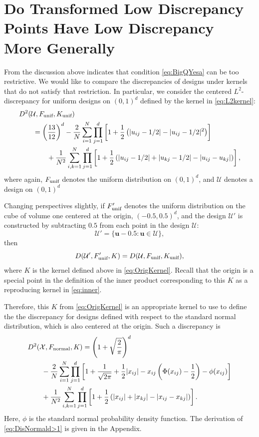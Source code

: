 \documentclass[graybox]{svmult}
\newcommand{\vu}{\boldsymbol{u}}
\newcommand{\Udes}{\mathcal{U}}
\newcommand{\Xdes}{\mathcal{X}}
\newcommand{\unif}{\textup{unif}}
\newcommand{\normal}{\textup{normal}}
\begin{document}
\section{Do Transformed Low Discrepancy Points Have Low Discrepancy More Generally}

From the discussion above indicates that condition \eqref{eq:BigQYesa} can be too restrictive.  We would like to compare the discrepancies of designs under kernels that do not satisfy that restriction.  In particular, we consider the centered $L^2$-discrepancy for uniform designs on $(0,1)^d$ defined by the kernel in \eqref{eq:L2kernel}:
\begin{align*}
\MoveEqLeft{D^2(\Udes, F_\unif, K_\unif)} \\
& = \left(\frac{13}{12}\right)^d - \frac{2}{N}\sum_{i=1}^N \prod_{j=1}^d \left[1+\frac{1}{2}\left(|u_{ij}-1/2|-|u_{ij}-1/2|^2\right) \right]\\
& \qquad + \frac{1}{N^2}\sum_{i,k=1}^N\prod_{j=1}^d\left[1+\frac{1}{2}\left(|u_{ij}-1/2|+|u_{kj}-1/2|-|u_{ij}-u_{kj}| \right) \right],  
\end{align*}
where again, $F_\unif$ denotes the uniform distribution on $(0,1)^d$, and $\Udes$ denotes a design on $(0,1)^d$

Changing perspectives slightly, if $F_\unif'$ denotes the uniform distribution on the cube of volume one centered at the origin, $(-\boldsymbol{0.5},\boldsymbol{0.5})^d$, and the design $\Udes'$ is constructed by  subtracting $\boldsymbol{0.5}$ from each point in the design $\Udes$:
\begin{equation} \label{eq:Updef}
    \Udes' = \{\vu -\boldsymbol{0.5} : \vu \in \Udes \},
\end{equation}
then 
\begin{equation} \label{eq:desEquiv}
     D(\Udes',F'_\unif,K) = D(\Udes, F_\unif, K_\unif),
\end{equation}
where $K$ is the kernel defined above in \eqref{eq:OrigKernel}.  Recall that the origin is a special point in the definition of the inner product corresponding to this $K$ as a reproducing kernel in \eqref{eq:inner}.

Therefore, this $K$ from \eqref{eq:OrigKernel} is an appropriate kernel to use to define the the discrepancy for designs defined with respect to the standard normal distribution, which is also centered at the origin.  Such a discrepancy is 
\begin{align}\label{eq:DisNormald>1}
\nonumber
\MoveEqLeft{D^2(\Xdes, F_\normal, K) = \left(1+\sqrt{\frac{2}{\pi}}\right)^d}\\
\nonumber
  & - \frac{2}{N}\sum_{i=1}^N \prod\limits_{j=1}^d\left[ 1+\frac{1}{\sqrt{2\pi}}+\frac{1}{2}|x_{ij}|-x_{ij}\left(\Phi(x_{ij})-\frac 12 \right)-\phi(x_{ij})\right]\\
  &+\frac{1}{N^2}\sum_{i,k=1}^N \prod_{j=1}^d \left[1+\frac{1}{2}\left(|x_{ij}|+|x_{kj}|-|x_{ij}-x_{kj}|\right)\right]. 
\end{align}
Here, $\phi$ is the standard normal probability density function. 
The derivation of \eqref{eq:DisNormald>1} is given in the Appendix. 
\end{document}
